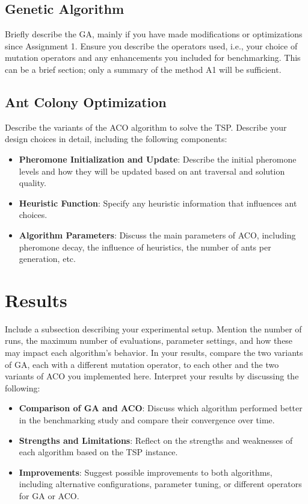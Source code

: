 \documentclass[runningheads]{llncs}
\begin{document}
\subsection{Genetic Algorithm}
Briefly describe the GA, mainly if you have made modifications or optimizations since Assignment 1. Ensure you describe the operators used, i.e., your choice of mutation operators and any enhancements you included for benchmarking. This can be a brief section; only a summary of the method A1 will be sufficient. 

\subsection{Ant Colony Optimization}
Describe the variants of the ACO algorithm to solve the TSP. Describe your design choices in detail, including the following components:
\begin{itemize}
    \item \textbf{Pheromone Initialization and Update}: Describe the initial pheromone levels and how they will be updated based on ant traversal and solution quality.
    \item \textbf{Heuristic Function}: Specify any heuristic information that influences ant choices.
    \item \textbf{Algorithm Parameters}: Discuss the main parameters of ACO, including pheromone decay, the influence of heuristics, the number of ants per generation, etc.
\end{itemize}


\section{Results}
Include a subsection describing your experimental setup. Mention the number of runs, the maximum number of evaluations, parameter settings, and how these may impact each algorithm’s behavior. In your results, compare the two variants of GA, each with a different mutation operator, to each other and the two variants of ACO you implemented here. Interpret your results by discussing the following:

\begin{itemize}
    \item \textbf{Comparison of GA and ACO}: Discuss which algorithm performed better in the benchmarking study and compare their convergence over time. 
    \item \textbf{Strengths and Limitations}: Reflect on the strengths and weaknesses of each algorithm based on the TSP instance.
    \item \textbf{Improvements}: Suggest possible improvements to both algorithms, including alternative configurations, parameter tuning, or different operators for GA or ACO.
\end{itemize}
\end{document}
